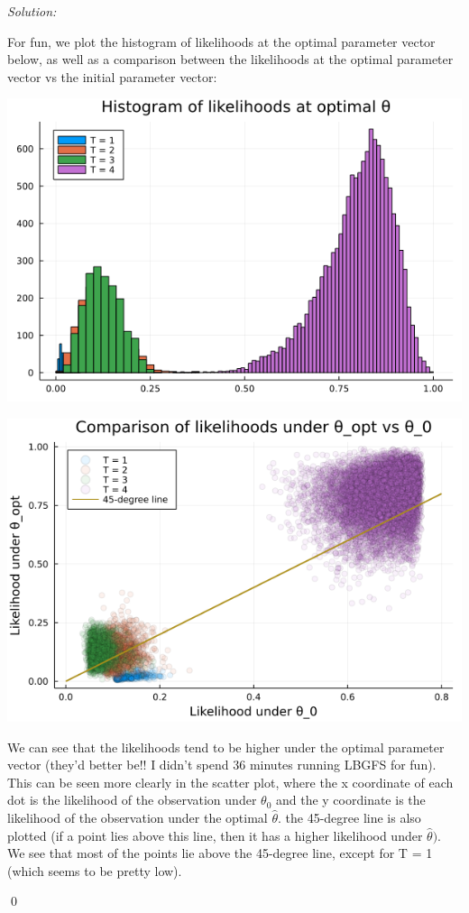 \documentclass[12pt]{article}
\newenvironment{sol}
    {\emph{Solution:}
    }
    {
    \qed
    }
\begin{document}
\begin{sol}
For fun, we plot the histogram of likelihoods at the optimal parameter vector below, as well as a comparison between the likelihoods at the optimal parameter vector vs the initial parameter vector:
\begin{center}
    \includegraphics[scale=0.5]{opt_hist.png}
\end{center}
\begin{center}
    \includegraphics[scale=0.5]{scatter_comp.png}
\end{center}
We can see that the likelihoods tend to be higher under the optimal parameter vector (they'd better be!! I didn't spend 36 minutes running LBGFS for fun). This can be seen more clearly in the scatter plot, where the x coordinate of each dot is the likelihood of the observation under $\theta_0$ and the y coordinate is the likelihood of the observation under the optimal $\hat{\theta}$. the 45-degree line is also plotted (if a point lies above this line, then it has a higher likelihood under $\hat{\theta})$. We see that most of the points lie above the 45-degree line, except for T = 1 (which seems to be pretty low).
\end{sol}
\end{document}
